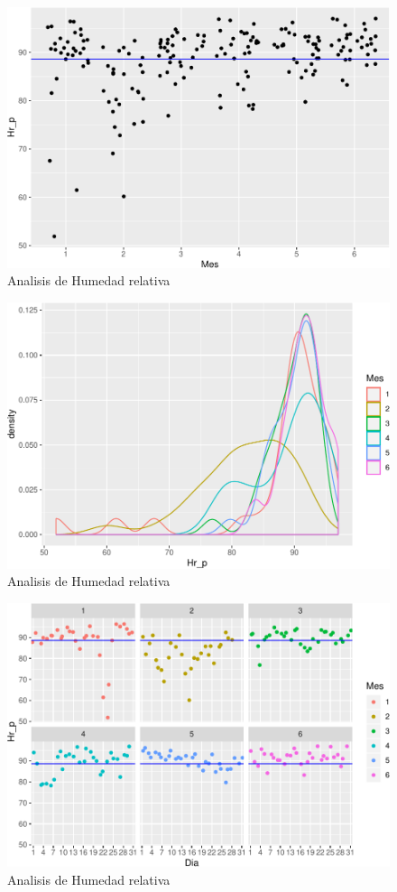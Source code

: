\documentclass[conference,final,]{IEEEtran}
\makeatletter
\def\maxwidth{\ifdim\Gin@nat@width>\linewidth\linewidth
\else\Gin@nat@width\fi}
\let\Oldincludegraphics\includegraphics
\renewcommand{\includegraphics}[1]{\Oldincludegraphics[width=\maxwidth]{#1}}
\makeatother
\begin{document}
\begin{figure}
\centering
\includegraphics{Hidrology_files/figure-latex/unnamed-chunk-6-1.pdf}
\caption{Analisis de Humedad relativa}
\end{figure}

\begin{figure}
\centering
\includegraphics{Hidrology_files/figure-latex/unnamed-chunk-7-1.pdf}
\caption{Analisis de Humedad relativa}
\end{figure}

\begin{figure}
\centering
\includegraphics{Hidrology_files/figure-latex/unnamed-chunk-8-1.pdf}
\caption{Analisis de Humedad relativa}
\end{figure}
\end{document}
